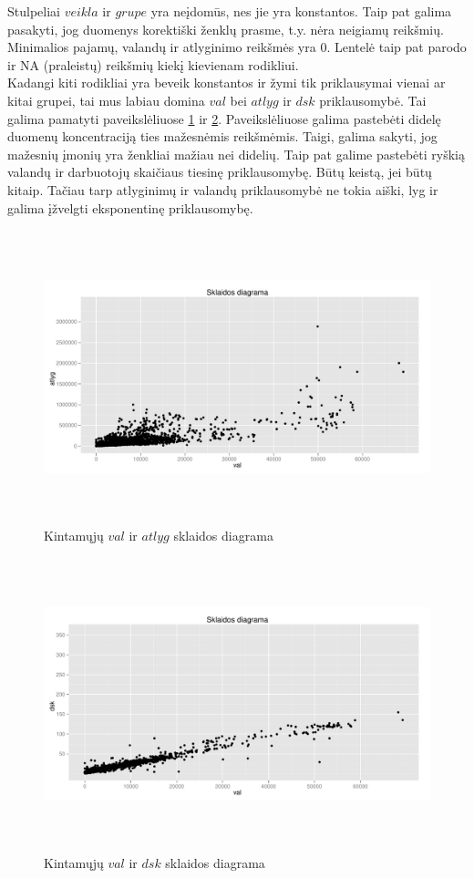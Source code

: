 \documentclass[a4paper]{article}
\begin{document}
Stulpeliai $veikla$ ir $grupe$ yra neįdomūs, nes jie yra
konstantos. Taip pat galima pasakyti, jog duomenys korektiški ženklų
prasme, t.y. nėra neigiamų reikšmių. Minimalios pajamų, valandų ir
atlyginimo reikšmės yra 0. Lentelė taip pat parodo ir NA (praleistų)
reikšmių kiekį kievienam rodikliui.\\
Kadangi kiti rodikliai yra beveik konstantos ir žymi tik priklausymai
vienai ar kitai grupei, tai mus labiau domina $val$ bei $atlyg$ ir
$dsk$ priklausomybė. Tai galima pamatyti paveikslėliuose
\ref{fig:valatlyg} ir \ref{fig:valdsk}. Paveikslėliuose galima
pastebėti didelę duomenų koncentraciją ties mažesnėmis
reikšmėmis. Taigi, galima sakyti, jog mažesnių įmonių yra ženkliai
mažiau nei didelių. Taip pat galime pastebėti ryškią valandų ir
darbuotojų skaičiaus tiesinę priklausomybę. Būtų keistą, jei būtų
kitaip. Tačiau tarp atlyginimų ir valandų priklausomybė ne tokia
aiški, lyg ir galima įžvelgti eksponentinę priklausomybę.

\begin{figure}[here]
\includegraphics[height=8.5cm]{val_atlyg.pdf}
\caption{Kintamųjų $val$ ir $atlyg$ sklaidos diagrama}
\label{fig:valatlyg}
\end{figure}

\begin{figure}[here]
\includegraphics[height=8.5cm]{val_dsk.pdf}
\caption{Kintamųjų $val$ ir $dsk$ sklaidos diagrama}
\label{fig:valdsk}
\end{figure}
\end{document}

